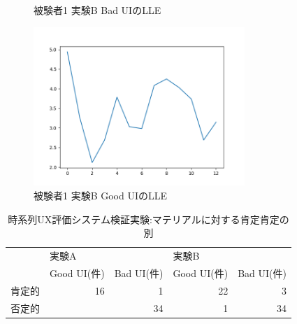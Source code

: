 \begin{figure}[htbp]
\begin{minipage}{0.5\hsize}
\begin{center}
    \end{center}
    \caption{被験者1 実験B Bad UIのLLE}
    \label{fig:lleb1}
  \end{minipage}
    \begin{minipage}{0.5\hsize}
    \begin{center}
       \includegraphics[width=80mm]{img/lle/1B-2.png}
    \end{center}
    \caption{被験者1 実験B Good UIのLLE}
    \label{fig:lleb2}
  \end{minipage}
\end{figure}

\begin{table}[htbp]
\centering
\begin{tabular}{llrlr}
\hline
    & \multicolumn{2}{l}{実験A}                             & \multicolumn{2}{l}{実験B}                             \\ \cline{2-5} 
    & Good UI(件)                & \multicolumn{1}{l}{Bad UI(件)} & Good UI(件)                & \multicolumn{1}{l}{Bad UI(件)} \\ \hline
肯定的 & \multicolumn{1}{r}{16} & 1                          & \multicolumn{1}{r}{22} & 3                          \\
否定的 & \multicolumn{1}{r}{}   & 34                         & \multicolumn{1}{r}{1}  & 34                         \\ \hline
\end{tabular}
\caption{時系列UX評価システム検証実験:マテリアルに対する肯定肯定の別}
\label{table:negaposi}
\end{table}

